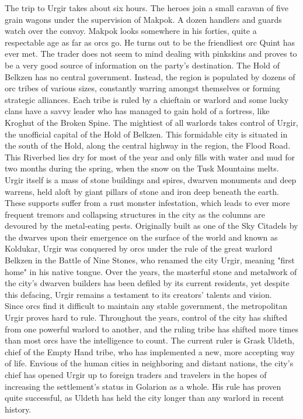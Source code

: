 The trip to Urgir takes about six hours. The heroes join a small caravan of five grain wagons under the supervision of Makpok. A dozen handlers and guards watch over the convoy. Makpok looks somewhere in his forties, quite a respectable age as far as orcs go. He turns out to be the friendliest orc Quint has ever met. The trader does not seem to mind dealing with pinkskins and proves to be a very good source of information on the party's destination. The Hold of Belkzen has no central government. Instead, the region is populated by dozens of orc tribes of various sizes, constantly warring amongst themselves or forming strategic alliances. Each tribe is ruled by a chieftain or warlord and some lucky clans have a savvy leader who has managed to gain hold of a fortress, like Kroghut of the Broken Spine. The mightiest of all warlords takes control of Urgir, the unofficial capital of the Hold of Belkzen. This formidable city is situated in the south of the Hold, along the central highway in the region, the Flood Road. This Riverbed lies dry for most of the year and only fills with water and mud for two months during the spring, when the snow on the Tusk Mountains melts.\\

Urgir itself is a mass of stone buildings and spires, dwarven monuments and deep warrens, held aloft by giant pillars of stone and iron deep beneath the earth. These supports suffer from a rust monster infestation, which leads to ever more frequent tremors and collapsing structures in the city as the columns are devoured by the metal-eating pests. Originally built as one of the Sky Citadels by the dwarves upon their emergence on the surface of the world and known as Koldukar, Urgir was conquered by orcs under the rule of the great warlord Belkzen in the Battle of Nine Stones, who renamed the city Urgir, meaning "first home" in his native tongue. Over the years, the masterful stone and metalwork of the city's dwarven builders has been defiled by its current residents, yet despite this defacing, Urgir remains a testament to its creators' talents and vision.\\

Since orcs find it difficult to maintain any stable government, the metropolitan Urgir proves hard to rule. Throughout the years, control of the city has shifted from one powerful warlord to another, and the ruling tribe has shifted more times than most orcs have the intelligence to count. The current ruler is Grask Uldeth, chief of the Empty Hand tribe, who has implemented a new, more accepting way of life. Envious of the human cities in neighboring and distant nations, the city's chief has opened Urgir up to foreign traders and travelers in the hopes of increasing the settlement's status in Golarion as a whole. His rule has proven quite successful, as Uldeth has held the city longer than any warlord in recent history.\\

